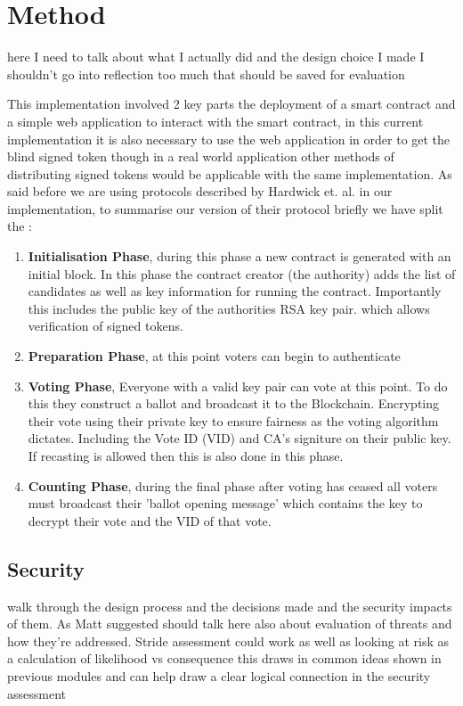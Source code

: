 \documentclass{entcs}
\begin{document}
\section{Method}
here I need to talk about what I actually did and the design choice I made I shouldn't go into reflection too much that should be saved for evaluation

This implementation involved 2 key parts the deployment of a smart contract and a simple web application to interact with the smart contract, in this current implementation it is also necessary to use the web application in order to get the blind signed token though in a real world application other methods of distributing signed tokens would be applicable with the same implementation.
As said before we are using protocols described by Hardwick et. al. in our implementation, to summarise our version of their protocol briefly we have split the :
\begin{enumerate}
    \item \textbf{Initialisation Phase}, during this phase a new contract is generated with an initial block. In this phase the contract creator (the authority) adds the list of candidates as well as key information for running the contract. Importantly this includes the public key of the authorities RSA key pair. which allows verification of signed tokens.
    \item \textbf{Preparation Phase}, at this point voters can begin to authenticate 
    \item \textbf{Voting Phase}, Everyone with a valid key pair can vote at this point. To do this they construct a ballot and broadcast it to the Blockchain. Encrypting their vote using their private key to ensure fairness as the voting algorithm dictates. Including the Vote ID (VID) and CA's signiture on their public key. If recasting is allowed then this is also done in this phase.
    \item \textbf{Counting Phase}, during the final phase after voting has ceased all voters must broadcast their 'ballot opening message' which contains the key to decrypt their vote and the VID of that vote.
\end{enumerate}


\subsection{Security}
walk through the design process and the decisions made and the security impacts of them.
As Matt suggested should talk here also about evaluation of threats and how they're addressed. 
Stride assessment could work as well as looking at risk as a calculation of likelihood vs consequence this draws in common ideas shown in previous modules and can help draw a clear logical connection in the security assessment
\end{document}
